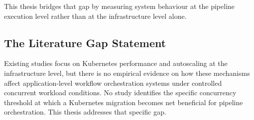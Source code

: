This thesis bridges that gap by measuring system behaviour at the pipeline execution level rather than at the infrastructure level alone.

\subsection{The Literature Gap Statement}
\label{subsec:gap-statement}

Existing studies focus on Kubernetes performance and autoscaling at the infrastructure level, but there is no empirical evidence on how these mechanisms affect application-level workflow orchestration systems under controlled concurrent workload conditions. No study identifies the specific concurrency threshold at which a Kubernetes migration becomes net beneficial for pipeline orchestration. This thesis addresses that specific gap.

